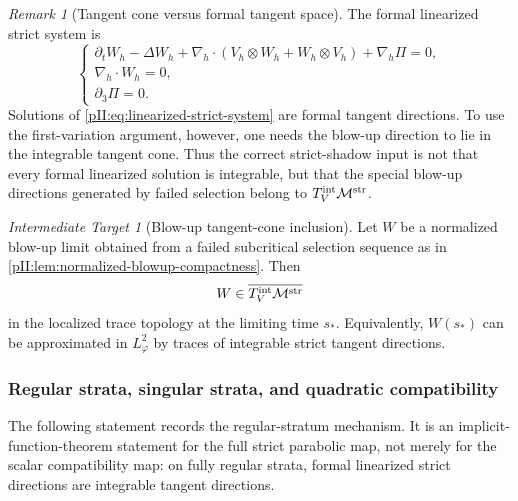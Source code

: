 \documentclass[11pt]{article}
\numberwithin{equation}{section}
\theoremstyle{plain}
\theoremstyle{definition}
\theoremstyle{remark}
\newtheorem{target}{Intermediate Target}[section]
\newtheorem{remark}{Remark}[section]
\newcommand{\str}{\mathrm{str}}
\begin{document}
\begin{remark}[Tangent cone versus formal tangent space]\label{pII:rem:tangent-cone-vs-space}
The formal linearized strict system is
\begin{equation}\label{pII:eq:linearized-strict-system}
\begin{cases}
\partial_tW_h-\Delta W_h+\nabla_h\cdot(V_h\otimes W_h+W_h\otimes V_h)+\nabla_h\Pi=0,\\
\nabla_h\cdot W_h=0,\\
\partial_3\Pi=0.
\end{cases}
\end{equation}
Solutions of \eqref{pII:eq:linearized-strict-system} are formal tangent directions.  To use the first-variation argument, however, one needs the blow-up direction to lie in the integrable tangent cone.  Thus the correct strict-shadow input is not that every formal linearized solution is integrable, but that the special blow-up directions generated by failed selection belong to $T^{\rm int}_V\mathcal M^{\str}$.
\end{remark}

\begin{target}[Blow-up tangent-cone inclusion]\label{pII:ass:blowup-tangent-cone-inclusion}
Let $W$ be a normalized blow-up limit obtained from a failed subcritical selection sequence as in \cref{pII:lem:normalized-blowup-compactness}.  Then
\begin{equation}\label{pII:eq:blowup-in-cone}
        W\in \overline{T^{\rm int}_V\mathcal M^{\str}}
\end{equation}
in the localized trace topology at the limiting time $s_*$.  Equivalently, $W(s_*)$ can be approximated in $L^2_\varphi$ by traces of integrable strict tangent directions.
\end{target}

\subsubsection{Regular strata, singular strata, and quadratic compatibility}

The following statement records the regular-stratum mechanism.  It is an implicit-function-theorem statement for the full strict parabolic map, not merely for the scalar compatibility map: on fully regular strata, formal linearized strict directions are integrable tangent directions.
\end{document}

